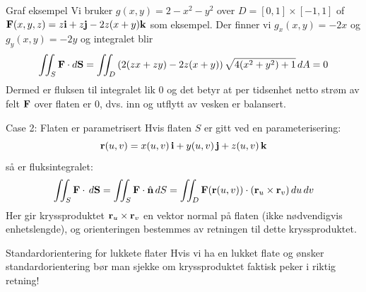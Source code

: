 \begin{eks}{Graf eksempel}
Vi bruker $g(x,y)=2-x^2-y^2$ over $D=[0,1] \times [-1,1]$ of $\mathbf{F}(x,y,z)=z\mathbf{i}+z\mathbf{j}-2z(x+y)\mathbf{k}$ som eksempel. Der finner vi $g_x(x,y)=-2x$ og $g_y(x,y)=-2y$ og integralet blir
\[\iint_S \mathbf{F} \cdot d \mathbf{S} = \iint_D \left(2(zx+zy)-2z(x+y)\right)\sqrt{4(x^2+y^2)+1}\, dA = 0\]
Dermed er fluksen til integralet lik $0$ og det betyr at per tidsenhet netto strøm av felt $\mathbf{F}$ over flaten er $0$, dvs. inn og utflytt av vesken er balansert.
\end{eks}

\begin{oppsum}{Case 2: Flaten er parametrisert}
Hvis flaten \( S \) er gitt ved en parameterisering:
\[
\mathbf{r}(u, v) = x(u, v)\, \mathbf{i} + y(u, v)\, \mathbf{j} + z(u, v)\, \mathbf{k}
\]
så er fluksintegralet:
\[
\iint_S \mathbf{F} \cdot\, d\mathbf{S} = \iint_S \mathbf{F} \cdot \hat{\mathbf{n}}\, dS = \iint_D \mathbf{F}(\mathbf{r}(u,v)) \cdot (\mathbf{r}_u \times \mathbf{r}_v)\, du\, dv
\]
Her gir kryssproduktet \( \mathbf{r}_u \times \mathbf{r}_v \) en vektor normal på flaten (ikke nødvendigvis enhetslengde), og orienteringen bestemmes av retningen til dette kryssproduktet.
\begin{minipage}{\textwidth}
\begin{rem}{Standardorientering for lukkete flater} Hvis vi ha en lukket flate og ønsker standardorientering bør man sjekke om kryssproduktet faktisk peker i riktig retning!
\end{rem}
\end{minipage}
\end{oppsum}

